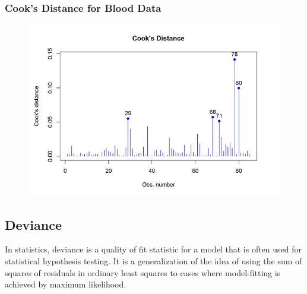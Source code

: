 \newpage
\subsubsection{Cook's Distance for Blood Data}
\begin{figure}[h!]
	\centering
	\includegraphics[width=0.9\linewidth]{images/CooksDistancePlot-JS-Roy}
\end{figure}


\newpage
\subsection{Deviance}
In statistics, deviance is a quality of fit statistic for a model that is often used for statistical hypothesis testing. It is a generalization of the idea of using the sum of squares of residuals in ordinary least squares to cases where model-fitting is achieved by maximum likelihood.





